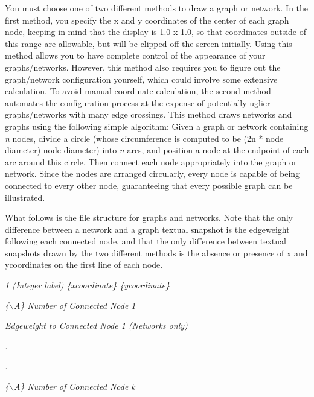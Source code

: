 \documentclass[12pt]{article}
\begin{document}
{\footnotesize{}You must choose one of two different methods to draw a graph or network.  In the first method, you specify the x and y coordinates of the center of each graph node, keeping in mind that the display is 1.0 x 1.0, so that coordinates outside of this range are allowable, but will be clipped off the screen initially.  Using this method allows you to have complete control of the appearance of your  graphs/networks.  However, this method also requires you to figure out the graph/network configuration yourself, which could involve some extensive calculation.  To avoid manual coordinate calculation, the second method automates the configuration process at the expense of potentially uglier graphs/networks with many edge crossings.  This method draws networks and graphs using the following simple algorithm:  Given a graph or network containing }\textit{{\footnotesize{}n}}{\footnotesize{} nodes, divide a circle (whose circumference is computed to be (2n * node diameter)  node diameter) into }\textit{{\footnotesize{}n}}{\footnotesize{} arcs, and position a node at the endpoint of each arc around this circle.  Then connect each node appropriately into the graph or network.  Since the nodes are arranged circularly, every node is capable of being connected to every other node, guaranteeing that every possible graph can be illustrated.}



{\footnotesize{}What follows is the file structure for graphs and networks.  Note that the only difference between a network and a graph textual snapshot is the edgeweight following each connected node, and that the only difference between textual snapshots drawn by the two different methods is the absence or presence of  x and ycoordinates on the first line of each node.}



\textit{{\footnotesize{}                1  (Integer label)  \{xcoordinate\} \{ycoordinate\}}}

\textit{{\footnotesize{}                \{\ensuremath{\backslash}A\} Number of Connected Node 1}}

\textit{{\footnotesize{}        Edgeweight  to Connected Node 1 (Networks only)}}

\textit{{\footnotesize{}                        .}}

\textit{{\footnotesize{}                        .}}

\textit{{\footnotesize{}                \{\ensuremath{\backslash}A\}  Number of Connected Node k}}
\end{document}
